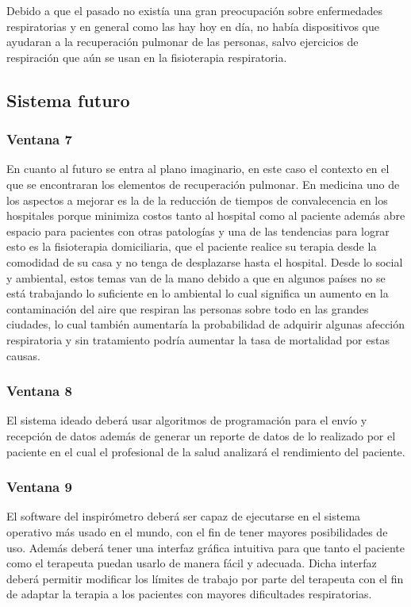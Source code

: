 \documentclass[12pt]{article}
\begin{document}
Debido a que el pasado no existía una gran preocupación sobre enfermedades respiratorias y en general como las hay hoy en día, no había dispositivos que ayudaran a la recuperación pulmonar de las personas, salvo ejercicios de respiración que aún se usan en la fisioterapia respiratoria. 




\subsection{Sistema futuro} 

\subsubsection{Ventana 7}

En cuanto al futuro se entra al plano imaginario, en este caso el contexto en el que se encontraran los elementos de recuperación pulmonar. 
En medicina uno de los aspectos a mejorar es la de la reducción de tiempos de convalecencia en los hospitales porque minimiza costos tanto al hospital como al paciente además abre espacio para pacientes con otras patologías y una de las tendencias para lograr esto es la fisioterapia domiciliaria, que el paciente realice su terapia desde la comodidad de su casa y no tenga de desplazarse hasta el hospital. Desde lo social y ambiental, estos temas van de la mano debido a que en algunos países no se está trabajando lo suficiente en lo ambiental lo cual significa un aumento en la contaminación del aire que respiran las personas sobre todo en las grandes ciudades, lo cual también aumentaría la probabilidad de adquirir algunas afección respiratoria y sin tratamiento podría aumentar la tasa de mortalidad por estas causas. 

\subsubsection{Ventana 8}

El sistema ideado deberá usar algoritmos de programación para el envío y recepción de datos además de generar un reporte de datos de lo realizado por el paciente en el cual el profesional de la salud analizará el rendimiento del paciente.

\subsubsection{Ventana 9}

El software del inspirómetro deberá ser capaz de ejecutarse en el sistema operativo más usado en el mundo, con el fin de tener mayores posibilidades de uso.  Además deberá tener una interfaz gráfica intuitiva para que tanto el paciente como el terapeuta puedan usarlo de manera fácil y adecuada. Dicha interfaz deberá permitir modificar los límites de trabajo por parte del terapeuta con el fin de adaptar la terapia a los pacientes con mayores dificultades respiratorias. 
\end{document}
